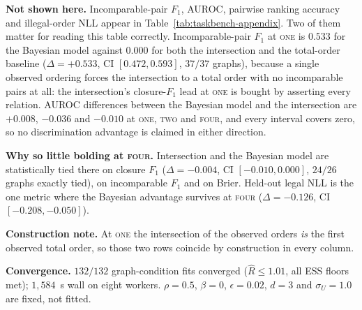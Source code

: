 \begin{table}[t]
\vspace{2pt}
\begin{minipage}{\linewidth}
\footnotesize
\textbf{Not shown here.} Incomparable-pair $F_1$, AUROC, pairwise ranking
accuracy and illegal-order NLL appear in
Table~\ref{tab:taskbench-appendix}. Two of them matter for reading this table
correctly. Incomparable-pair $F_1$ at \textsc{one} is $0.533$ for the Bayesian
model against $0.000$ for both the intersection and the total-order baseline
($\Delta = +0.533$, CI $[0.472, 0.593]$, $37/37$ graphs), because a single
observed ordering forces the intersection to a total order with no incomparable
pairs at all: the intersection's closure-$F_1$ lead at \textsc{one} is bought
by asserting every relation. AUROC differences between the Bayesian model and
the intersection are $+0.008$, $-0.036$ and $-0.010$ at \textsc{one},
\textsc{two} and \textsc{four}, and every interval covers zero, so no
discrimination advantage is claimed in either direction.

\textbf{Why so little bolding at \textsc{four}.} Intersection and the Bayesian
model are statistically tied there on closure $F_1$ ($\Delta = -0.004$, CI
$[-0.010, 0.000]$, $24/26$ graphs exactly tied), on incomparable $F_1$ and on
Brier. Held-out legal NLL is the one metric where the Bayesian advantage
survives at \textsc{four} ($\Delta = -0.126$, CI $[-0.208, -0.050]$).

\textbf{Construction note.} At \textsc{one} the intersection of the observed
orders \emph{is} the first observed total order, so those two rows coincide by
construction in every column.

\textbf{Convergence.} $132/132$ graph-condition fits converged
($\widehat{R} \leq 1.01$, all ESS floors met); $1{,}584$~s wall on eight
workers. $\rho = 0.5$, $\beta = 0$, $\epsilon = 0.02$, $d = 3$ and
$\sigma_U = 1.0$ are fixed, not fitted.
\end{minipage}
\end{table}
